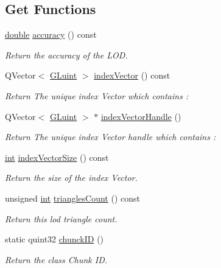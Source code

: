 \subsection*{Get Functions}
\begin{DoxyCompactItemize}
\item 
\hyperlink{_super_l_u_support_8h_a8956b2b9f49bf918deed98379d159ca7}{double} \hyperlink{class_g_l_c___lod_a0fef13a35738091fec85fff5922cbf8c}{accuracy} () const 
\begin{DoxyCompactList}\small\item\em Return the accuracy of the L\-O\-D. \end{DoxyCompactList}\item 
Q\-Vector$<$ \hyperlink{glext_8h_a2f0c8cd5c21f9fcbd931c3f48bc90dfc}{G\-Luint} $>$ \hyperlink{class_g_l_c___lod_a459876a71c84a3d507b1341d3055f12e}{index\-Vector} () const 
\begin{DoxyCompactList}\small\item\em Return The unique index Vector which contains \-: \end{DoxyCompactList}\item 
Q\-Vector$<$ \hyperlink{glext_8h_a2f0c8cd5c21f9fcbd931c3f48bc90dfc}{G\-Luint} $>$ $\ast$ \hyperlink{class_g_l_c___lod_ac339ca05e7d211561b6b21bd2ab108e5}{index\-Vector\-Handle} ()
\begin{DoxyCompactList}\small\item\em Return The unique index Vector handle which contains \-: \end{DoxyCompactList}\item 
\hyperlink{ioapi_8h_a787fa3cf048117ba7123753c1e74fcd6}{int} \hyperlink{class_g_l_c___lod_a95bd9c1df8e807dcb6de3102e4159077}{index\-Vector\-Size} () const 
\begin{DoxyCompactList}\small\item\em Return the size of the index Vector. \end{DoxyCompactList}\item 
unsigned \hyperlink{ioapi_8h_a787fa3cf048117ba7123753c1e74fcd6}{int} \hyperlink{class_g_l_c___lod_a284707f0c886b5c798e13c4ae1f80368}{triangles\-Count} () const 
\begin{DoxyCompactList}\small\item\em Return this lod triangle count. \end{DoxyCompactList}\item 
static quint32 \hyperlink{class_g_l_c___lod_a18d05ff90913e567a472af0c272518cc}{chunck\-I\-D} ()
\begin{DoxyCompactList}\small\item\em Return the class Chunk I\-D. \end{DoxyCompactList}\end{DoxyCompactItemize}


